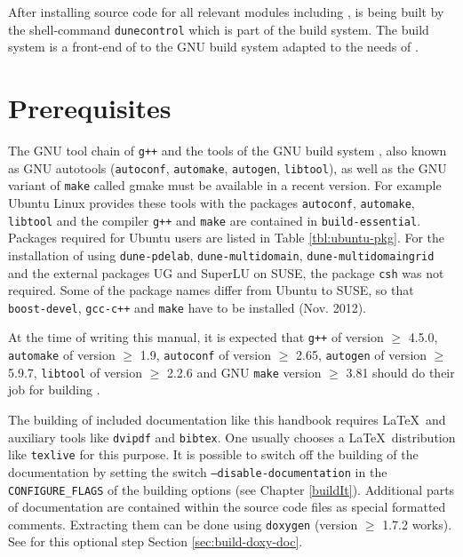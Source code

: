 After installing source code for all relevant \Dune modules including \Dumux, \Dune is being built by the shell-command \texttt{dunecontrol} which is part of the \Dune build system. The \Dune build system is a front-end of to the GNU build system adapted to the needs of \Dune.

\section{Prerequisites} \label{sec:prerequisites}
The GNU tool chain of \texttt{g++}  and the tools of the GNU build system \cite{GNU-BS}, also known as GNU autotools
(\texttt{autoconf}, \texttt{automake}, \texttt{autogen}, \texttt{libtool}), as well as the GNU variant of \texttt{make}
called gmake must be available in a recent version. For example Ubuntu Linux provides these tools with the
packages \texttt{autoconf}, \texttt{automake}, \texttt{libtool}
and the \Cplusplus compiler \texttt{g++} and \texttt{make} are contained in \texttt{build-essential}. Packages required for Ubuntu users are listed in Table \ref{tbl:ubuntu-pkg}. For the installation of \Dumux using \texttt{dune-pdelab}, \texttt{dune-multidomain}, \texttt{dune-multidomaingrid} and the external packages UG and SuperLU on SUSE, the package \texttt{csh} was not required. Some of the package names differ from Ubuntu to SUSE, so that \texttt{boost-devel}, \texttt{gcc-c++} and \texttt{make} have to be installed (Nov. 2012).

At the time of writing this manual, it is expected that \texttt{g++} of version $\geqslant$ 4.5.0, \texttt{automake} of version $\geqslant$ 1.9,
\texttt{autoconf} of version $\geqslant$ 2.65, \texttt{autogen} of version $\geqslant$ 5.9.7,  \texttt{libtool} of version $\geqslant$ 2.2.6
and GNU \texttt{make} version $\geqslant$ 3.81 should do their job for building \Dumux.

The building of included documentation like this handbook requires \LaTeX\  and auxiliary tools
like \texttt{dvipdf} and \texttt{bibtex}. One usually chooses a \LaTeX\  distribution like \texttt{texlive} for this purpose.
It is possible to switch off the building of the documentation by setting the switch \texttt{--disable-documentation} 
in the \texttt{CONFIGURE\_FLAGS} of the building options (see Chapter \ref{buildIt}).
Additional parts of documentation are contained within the source code files as special formatted comments.
Extracting them can be done using \texttt{doxygen} (version $\geqslant$ 1.7.2 works). 
See for this optional step Section \ref{sec:build-doxy-doc}.

